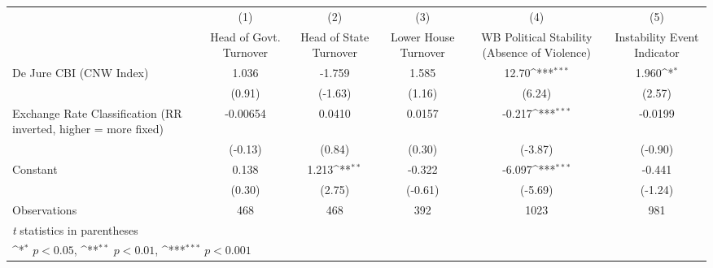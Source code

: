 {
\def\sym#1{\ifmmode^{#1}\else\(^{#1}\)\fi}
\begin{tabular*}{\linewidth}{@{\hskip\tabcolsep\extracolsep\fill}l*{5}{c}}
\toprule
                &\multicolumn{1}{c}{(1)}&\multicolumn{1}{c}{(2)}&\multicolumn{1}{c}{(3)}&\multicolumn{1}{c}{(4)}&\multicolumn{1}{c}{(5)}\\
                &\multicolumn{1}{c}{Head of Govt. Turnover}&\multicolumn{1}{c}{Head of State Turnover}&\multicolumn{1}{c}{Lower House Turnover}&\multicolumn{1}{c}{WB Political Stability (Absence of Violence)}&\multicolumn{1}{c}{Instability Event Indicator}\\
\midrule
De Jure CBI (CNW Index)&    1.036         &   -1.759         &    1.585         &    12.70\sym{***}&    1.960\sym{*}  \\
                &   (0.91)         &  (-1.63)         &   (1.16)         &   (6.24)         &   (2.57)         \\
\addlinespace
Exchange Rate Classification (RR inverted, higher = more fixed)& -0.00654         &   0.0410         &   0.0157         &   -0.217\sym{***}&  -0.0199         \\
                &  (-0.13)         &   (0.84)         &   (0.30)         &  (-3.87)         &  (-0.90)         \\
\addlinespace
Constant        &    0.138         &    1.213\sym{**} &   -0.322         &   -6.097\sym{***}&   -0.441         \\
                &   (0.30)         &   (2.75)         &  (-0.61)         &  (-5.69)         &  (-1.24)         \\
\midrule
Observations    &      468         &      468         &      392         &     1023         &      981         \\
\bottomrule
\multicolumn{6}{l}{\footnotesize \textit{t} statistics in parentheses}\\
\multicolumn{6}{l}{\footnotesize \sym{*} \(p<0.05\), \sym{**} \(p<0.01\), \sym{***} \(p<0.001\)}\\
\end{tabular*}
}
